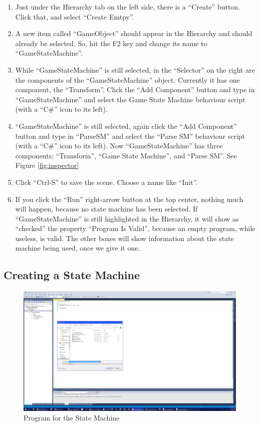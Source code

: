 \documentclass[letter,12pt]{article}
\begin{document}
\begin{enumerate}
\item Just under the Hierarchy tab on the left side, there is a “Create” button.  Click that, and select “Create Emtpy”.

\item A new item called “GameObject” should appear in the Hierarchy and should already be selected.  So, hit the F2 key and change its name to “GameStateMachine”.

\item While “GameStateMachine” is still selected, in the “Selector” on the right are the components of the “GameStateMachine” object.  Currently it has one component, the “Transform”.   Click the “Add Component” button and type in “GameStateMachine” and select the Game State Machine behaviour script (with a “C\#” icon to its left).  

\item “GameStateMachine” is still selected, again click the  “Add Component” button and type in “ParseSM” and select the “Parse SM” behaviour script (with a “C\#” icon to its left).  Now “GameStateMachine” has three components: “Transform”, “Game State Machine”, and “Parse SM”.  See Figure \ref{fig:inspector}

\item Click “Ctrl-S” to save the scene.  Choose a name like “Init”.

\item If you click the “Run” right-arrow button at the top center, nothing much will happen, because no state machine has been selected.  If “GameStateMachine” is still highlighted in the Hierarchy, it will show as “checked” the property “Program Is Valid”, because an empty program, while useless, is valid.  The other boxes will show information about the state machine being used, once we give it one.

\end{enumerate}

\subsection{Creating a State Machine}

\begin{figure}
 \includegraphics[width=6in]{vs.png}
 \caption{Program for the State Machine}
 \label{fig:vs}
\end{figure}
\end{document}
